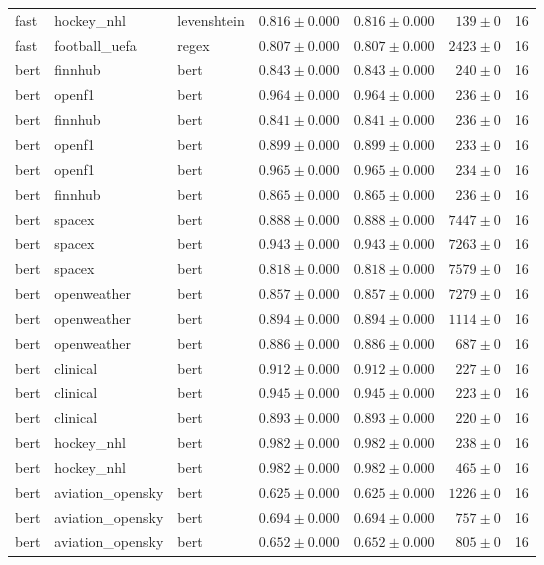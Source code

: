 \begin{table}[htbp]
\begin{tabular}{l l l r r r r}
fast & hockey\_nhl & levenshtein & $0.816\pm0.000$ & $0.816\pm0.000$ & $139\pm0$ & 16 \\
fast & football\_uefa & regex & $0.807\pm0.000$ & $0.807\pm0.000$ & $2423\pm0$ & 16 \\
bert & finnhub & bert & $0.843\pm0.000$ & $0.843\pm0.000$ & $240\pm0$ & 16 \\
bert & openf1 & bert & $0.964\pm0.000$ & $0.964\pm0.000$ & $236\pm0$ & 16 \\
bert & finnhub & bert & $0.841\pm0.000$ & $0.841\pm0.000$ & $236\pm0$ & 16 \\
bert & openf1 & bert & $0.899\pm0.000$ & $0.899\pm0.000$ & $233\pm0$ & 16 \\
bert & openf1 & bert & $0.965\pm0.000$ & $0.965\pm0.000$ & $234\pm0$ & 16 \\
bert & finnhub & bert & $0.865\pm0.000$ & $0.865\pm0.000$ & $236\pm0$ & 16 \\
bert & spacex & bert & $0.888\pm0.000$ & $0.888\pm0.000$ & $7447\pm0$ & 16 \\
bert & spacex & bert & $0.943\pm0.000$ & $0.943\pm0.000$ & $7263\pm0$ & 16 \\
bert & spacex & bert & $0.818\pm0.000$ & $0.818\pm0.000$ & $7579\pm0$ & 16 \\
bert & openweather & bert & $0.857\pm0.000$ & $0.857\pm0.000$ & $7279\pm0$ & 16 \\
bert & openweather & bert & $0.894\pm0.000$ & $0.894\pm0.000$ & $1114\pm0$ & 16 \\
bert & openweather & bert & $0.886\pm0.000$ & $0.886\pm0.000$ & $687\pm0$ & 16 \\
bert & clinical & bert & $0.912\pm0.000$ & $0.912\pm0.000$ & $227\pm0$ & 16 \\
bert & clinical & bert & $0.945\pm0.000$ & $0.945\pm0.000$ & $223\pm0$ & 16 \\
bert & clinical & bert & $0.893\pm0.000$ & $0.893\pm0.000$ & $220\pm0$ & 16 \\
bert & hockey\_nhl & bert & $0.982\pm0.000$ & $0.982\pm0.000$ & $238\pm0$ & 16 \\
bert & hockey\_nhl & bert & $0.982\pm0.000$ & $0.982\pm0.000$ & $465\pm0$ & 16 \\
bert & aviation\_opensky & bert & $0.625\pm0.000$ & $0.625\pm0.000$ & $1226\pm0$ & 16 \\
bert & aviation\_opensky & bert & $0.694\pm0.000$ & $0.694\pm0.000$ & $757\pm0$ & 16 \\
bert & aviation\_opensky & bert & $0.652\pm0.000$ & $0.652\pm0.000$ & $805\pm0$ & 16 \\

\end{tabular}
\end{table}
